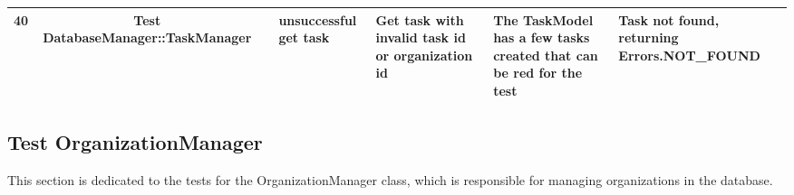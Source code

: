 \documentclass{article}
\begin{document}
{\begin{tabular}{|l|c|l|l|l|l|l|}
    \cellcolor[HTML]{FFFFFF}40                                    & \multirow{-40}{*}{\cellcolor[HTML]{FFFFFF}Test DatabaseManager::TaskManager} & \cellcolor[HTML]{FFFFFF}{\color[HTML]{11734B} Automated}        & unsuccessful get task                          & \cellcolor[HTML]{FFFFFF}Get task with invalid task id or organization id                                                         & \cellcolor[HTML]{FFFFFF}The TaskModel has a few tasks created that can be red for the test     & Task not found, returning Errors.NOT\_FOUND                                                                                   \\ \hline
  \end{tabular}
}

\subsection*{Test OrganizationManager}
This section is dedicated to the tests for the OrganizationManager class, which is responsible for managing organizations in the database.
\newline
\end{document}
